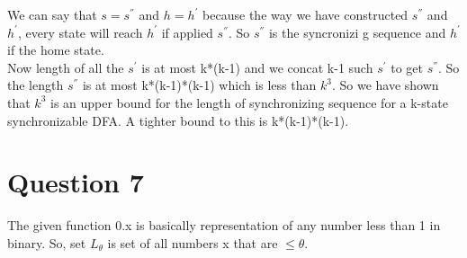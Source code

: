 \documentclass{article}
\begin{document}
We can say that $s=s^{''}$ and $h=h^{'}$ because the way we have constructed $s^{''}$ and $h^{'}$, every state will reach $h^{'}$ if applied $s^{''}$. So $s^{''}$ is the syncronizi g sequence and $h^{'}$ if the home state. \\
Now length of all the  $s^{'}$ is at most k*(k-1) and we concat k-1 such  $s^{'}$ to get  $s^{''}$. So the length  $s^{''}$ is at most k*(k-1)*(k-1) which is less than $k^3$. So we have shown that $k^3$ is an upper bound for the length of synchronizing sequence for a k-state synchronizable DFA. A tighter bound to this is k*(k-1)*(k-1).
\pagebreak




\section{Question 7}
The given function 0.x is basically representation of any number less than 1 in binary. So, set $L_{\theta}$ is set of all numbers x that are $\leq \theta$.
\end{document}

